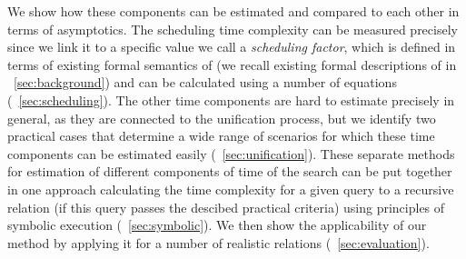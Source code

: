 We show how these components can be estimated and compared to each other in terms of asymptotics. The scheduling time complexity can be measured precisely since we link it to a specific value we call a
\emph{scheduling factor}, which is defined in terms of existing formal semantics of \mK (we recall existing formal descriptions of \mK in \sectionword~\ref{sec:background}) and can be calculated using
a number of equations (\sectionword~\ref{sec:scheduling}). The other time components are hard to estimate precisely in general, as they are connected to the unification process, but we identify two
practical cases that determine a wide range of scenarios for which these time components can be estimated easily (\sectionword~\ref{sec:unification}). These separate methods for estimation of
different components of time of the search can be put together in one approach calculating the time complexity for a given query to a recursive relation (if this query passes the descibed
practical criteria) using principles of symbolic execution (\sectionword~\ref{sec:symbolic}). We then show the applicability of our method by applying it for a number of realistic \mK relations (\sectionword~\ref{sec:evaluation}).
